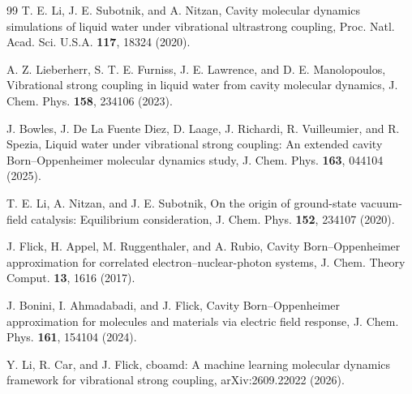 \documentclass[aps,prb,reprint,superscriptaddress,nofootinbib,floatfix]{revtex4-2}
\begin{document}
\begin{thebibliography}{99}
 T. E. Li, J. E. Subotnik, and A. Nitzan, Cavity molecular dynamics
simulations of liquid water under vibrational ultrastrong coupling, Proc. Natl. Acad.
Sci. U.S.A. \textbf{117}, 18324 (2020).

 A. Z. Lieberherr, S. T. E. Furniss, J. E. Lawrence, and
D. E. Manolopoulos, Vibrational strong coupling in liquid water from cavity molecular
dynamics, J. Chem. Phys. \textbf{158}, 234106 (2023).

 J. Bowles, J. De La Fuente Diez, D. Laage, J. Richardi,
R. Vuilleumier, and R. Spezia, Liquid water under vibrational strong coupling: An
extended cavity Born--Oppenheimer molecular dynamics study, J. Chem. Phys.
\textbf{163}, 044104 (2025).

 T. E. Li, A. Nitzan, and J. E. Subotnik, On the origin of
ground-state vacuum-field catalysis: Equilibrium consideration, J. Chem. Phys.
\textbf{152}, 234107 (2020).

 J. Flick, H. Appel, M. Ruggenthaler, and A. Rubio, Cavity
Born--Oppenheimer approximation for correlated electron--nuclear-photon systems,
J. Chem. Theory Comput. \textbf{13}, 1616 (2017).

 J. Bonini, I. Ahmadabadi, and J. Flick, Cavity Born--Oppenheimer
approximation for molecules and materials via electric field response, J. Chem. Phys.
\textbf{161}, 154104 (2024).

 Y. Li, R. Car, and J. Flick, cboamd: A machine learning molecular
dynamics framework for vibrational strong coupling, arXiv:2609.22022 (2026).

\end{thebibliography}
\end{document}
